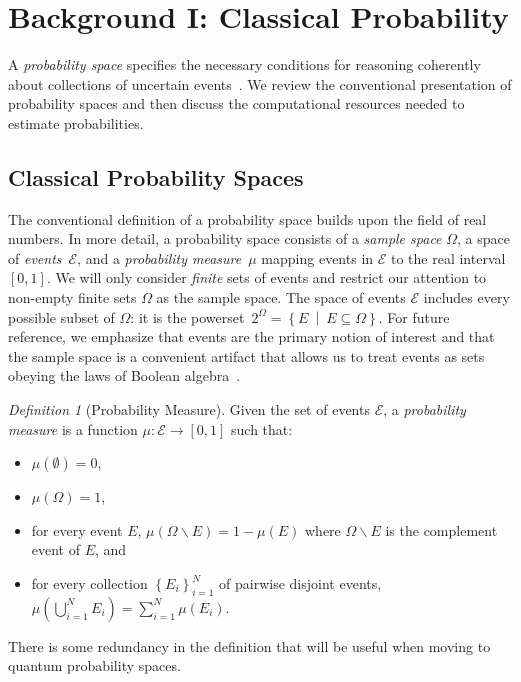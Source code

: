 \documentclass{article}
\theoremstyle{remark}
\newtheorem{definition}{Definition}
\newcommand{\events}{\ensuremath{\mathcal{E}}}
\newcommand{\pmeas}{\ensuremath{\mu}}
\begin{document}
\section{Background I: Classical Probability}

A \emph{probability space} specifies the necessary conditions for
reasoning coherently about collections of uncertain
events~\cite{Kolmogorov1950,Shafer1976,Griffiths2003,Swart2013}.  We
review the conventional presentation of probability spaces and then
discuss the computational resources needed to estimate probabilities.

\subsection{Classical Probability Spaces}

The conventional definition of a probability space builds upon the
field of real numbers. In more detail, a probability space consists of
a \emph{sample space} $\Omega$, a space of \emph{events}~$\events$,
and a \emph{probability measure}~$\pmeas$ mapping events in $\events$
to the real interval $[0,1]$. We will only consider \emph{finite} sets
of events and restrict our attention to non-empty finite sets $\Omega$
as the sample space. The space of events $\events$ includes every
possible subset of $\Omega$: it is the
powerset~$2^{\Omega}=\left\{ E ~\middle|~ E\subseteq\Omega\right\}
$.
For future reference, we emphasize that events are the primary notion
of interest and that the sample space is a convenient artifact that
allows us to treat events as sets obeying the laws of Boolean
algebra~\cite{Boole1948,Redhead1987-REDINA,Griffiths2003}.

\begin{definition}[Probability Measure]\label{def:ClassicalProbabilitySpace}
  Given the set of events $\events$, a \emph{probability measure} is a
  function $\pmeas:\events\rightarrow[0,1]$ such that:
\begin{itemize}
\item $\pmeas(\emptyset)=0$,
\item $\pmeas(\Omega)=1$, 
\item for every event $E$,
  $\pmeas\left(\Omega\backslash E\right)=1-\pmeas\left(E\right)$ where
  $\Omega\backslash E$ is the complement event of $E$, and
\item for every collection $\left\{ E_{i}\right\} _{i=1}^{N}$ of
  pairwise disjoint events,
  $\pmeas\left(\bigcup_{i=1}^{N}E_{i}\right)=\sum_{i=1}^{N}\pmeas(E_{i})$.
\end{itemize}
\end{definition}
\noindent There is some redundancy in the definition that will be useful when
moving to quantum probability spaces. 
\end{document}
